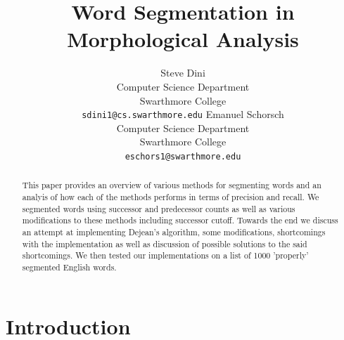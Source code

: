 \documentclass[11pt]{article}
\title{Word Segmentation in Morphological Analysis}
\author{Steve Dini\\
  Computer Science Department\\
  Swarthmore College\\
  {\tt sdini1@cs.swarthmore.edu}  
  \And                            %
  Emanuel Schorsch\\                 %
  Computer Science Department\\
  Swarthmore College\\
  {\tt eschors1@swarthmore.edu}}
\date{}
\begin{document}
\maketitle
\begin{abstract}
This paper provides an overview of various methods for segmenting words and 
an analyis of how each of the methods performs in terms of precision
and recall. We segmented words using successor and predecessor counts as well
as various modifications to these methods including successor cutoff. 
Towards the end we discuss an attempt at implementing Dejean's 
algorithm, some modifications, shortcomings with the implementation
as well as discussion of possible solutions to the said shortcomings. We then
tested our implementations on a list of 1000 'properly' segmented English words.
  
\end{abstract}

\section{Introduction}
\end{document}
